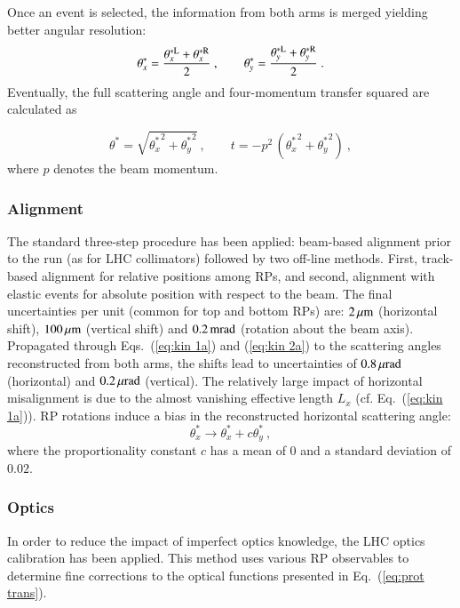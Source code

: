 Once an event is selected, the information from both arms is merged yielding better angular resolution:
\begin{equation}
\label{eq:kin 2a}
	\theta_x^* = {\theta_x^{*\rm L} + \theta_x^{*\rm R} \over 2}\ ,\qquad
	\theta_y^* = {\theta_y^{*\rm L} + \theta_y^{*\rm R} \over 2}\ .
\end{equation}
Eventually, the full scattering angle and four-momentum transfer squared are calculated as

\begin{equation}
\label{eq:th t}
	\theta^* = \sqrt{{\theta_x^*}^2 + {\theta_y^*}^2}\ ,\qquad
	t = - p^2\, \left({\theta_x^*}^2 + {\theta_y^*}^2\right)\ ,
\end{equation}
where $p$ denotes the beam momentum.


\subsubsection{Alignment}
\label{sec:alignment}

The standard three-step procedure \cite{totem-ijmp} has been applied: beam-based alignment prior to the run (as for LHC collimators) followed by two off-line methods. First, track-based alignment for relative positions among RPs, and second, alignment with elastic events for absolute position with respect to the beam. The final uncertainties per unit (common for top and bottom RPs) are: $2\,{\rm \mu m}$ (horizontal shift), $100\,{\rm \mu m}$ (vertical shift) and $0.2\,{\rm mrad}$ (rotation about the beam axis). Propagated through Eqs.~(\ref{eq:kin 1a}) and (\ref{eq:kin 2a}) to the scattering angles reconstructed from both arms, the shifts lead to uncertainties of $0.8\,{\rm \mu rad}$ (horizontal) and $0.2\,{\rm \mu rad}$ (vertical). The relatively large impact of horizontal misalignment is due to the almost vanishing effective length $L_x$ (cf. Eq.~(\ref{eq:kin 1a})). RP rotations induce a bias in the reconstructed horizontal scattering angle:
\begin{equation}
\label{eq:alig rot bias}
	\theta_x^* \rightarrow \theta_x^* + c \theta_y^*\ ,
\end{equation}
where the proportionality constant $c$ has a mean of 0 and a standard deviation of $0.02$.



\subsubsection{Optics}
\label{sec:optics}
%
In order to reduce the impact of imperfect optics knowledge, the LHC optics calibration \cite{totem-optics} has been applied. This method uses various RP observables to determine fine corrections to the optical functions presented in Eq.~(\ref{eq:prot trans}).

